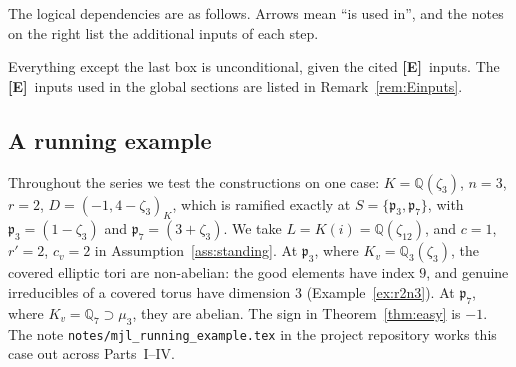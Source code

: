 \documentclass[12pt]{article}
\newcommand{\Ev}{\textbf{[E]}}
\theoremstyle{plain}
\theoremstyle{definition}
\begin{document}
The logical dependencies are as follows. Arrows mean ``is used in'', and the notes on the right list the additional inputs of each step.
\begin{center}
\end{center}
Everything except the last box is unconditional, given the cited \Ev\ inputs. The \Ev\ inputs used in the global sections are listed in Remark~\ref{rem:Einputs}.

\subsection*{A running example}
Throughout the series we test the constructions on one case: $K=\mathbb{Q}(\zeta_3)$, $n=3$, $r=2$, $D=(-1,4-\zeta_3)_K$, which is ramified exactly at $S=\{\mathfrak p_3,\mathfrak p_7\}$, with $\mathfrak p_3=(1-\zeta_3)$ and $\mathfrak p_7=(3+\zeta_3)$. We take $L=K(i)=\mathbb{Q}(\zeta_{12})$, and $c=1$, $r'=2$, $c_v=2$ in Assumption~\ref{ass:standing}. At $\mathfrak p_3$, where $K_v=\mathbb{Q}_3(\zeta_3)$, the covered elliptic tori are non-abelian: the good elements have index $9$, and genuine irreducibles of a covered torus have dimension $3$ (Example~\ref{ex:r2n3}). At $\mathfrak p_7$, where $K_v=\mathbb{Q}_7\supset\mu_3$, they are abelian. The sign in Theorem~\ref{thm:easy} is $-1$. The note \texttt{notes/mjl\_running\_example.tex} in the project repository works this case out across Parts~I--IV.
\end{document}
